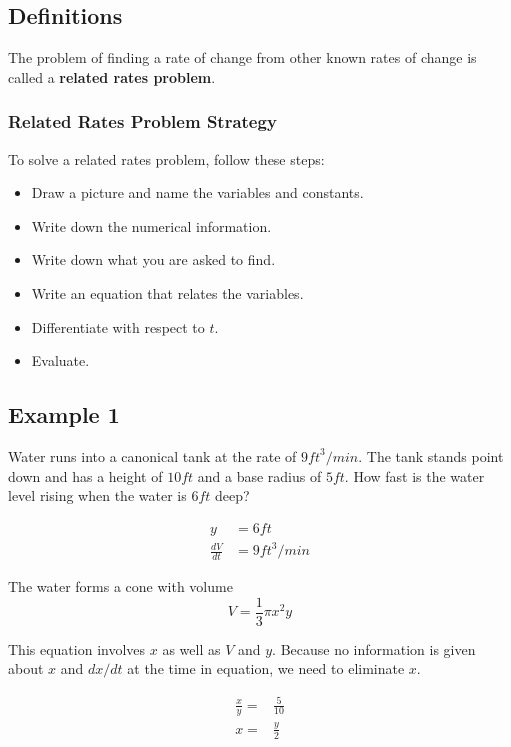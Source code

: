 \documentclass[fleqn]{article}
\begin{document}
\subsection*{Definitions}
\noindent
The problem of finding a rate of change from other known rates of change is called a \textbf{related rates problem}.
\newline

\subsubsection*{Related Rates Problem Strategy}
\noindent
To solve a related rates problem, follow these steps:
\begin{itemize}
\item Draw a picture and name the variables and constants.
\item Write down the numerical information.
\item Write down what you are asked to find.
\item Write an equation that relates the variables.
\item Differentiate with respect to $t$.
\item Evaluate.
\end{itemize}

\subsection*{Example 1}
\noindent
Water runs into a canonical tank at the rate of $9 {ft}^3/min$. The tank stands point down and has a height of $10 ft$ and a base radius of $5 ft$. How fast is the water level rising when the water is $6 ft$ deep?

\begin{align*}
    y &= 6 ft \\
    \frac{dV}{dt} &= 9 {ft}^3/min
\end{align*}

\noindent
The water forms a cone with volume
\begin{equation*}
    V = \frac{1}{3} \pi x^2 y
\end{equation*}

\noindent
This equation involves $x$ as well as $V$ and $y$. Because no information is given about $x$ and $dx/dt$ at the time in equation, we need to eliminate $x$.

\begin{align*}
    \frac{x}{y} =& \frac{5}{10} \\
    x =& \frac{y}{2}
\end{align*}
\end{document}
